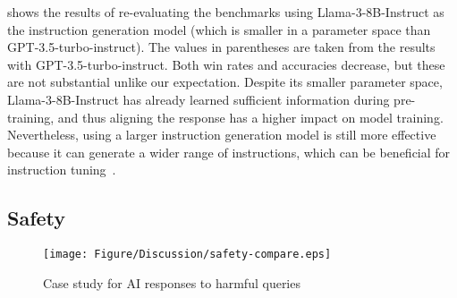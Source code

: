 
 shows the results of re-evaluating the benchmarks 
using Llama-3-8B-Instruct as the instruction generation model
(which is smaller in a parameter space than GPT-3.5-turbo-instruct).
The values in parentheses are taken from
the results with GPT-3.5-turbo-instruct.
Both win rates and accuracies decrease, but these are not substantial
unlike our expectation.
Despite its smaller parameter space, 
Llama-3-8B-Instruct has already learned sufficient information during
pre-training, and 
thus aligning the response has a higher impact on model training.
Nevertheless, using a larger instruction generation model is still
more effective because it can generate a wider range of instructions, 
which can be beneficial for instruction tuning~\cite{instruction-tuning}.

\begin{comment}
\sj{(치명적이지 않다면 아래 내용은 꼭 필요할 것 같지는 않네요)}
However, there is still a lack of in-depth insight into how the specific
characteristics of the instruction generation model, such as parameter size,
generation setting (temperature, top-p, and so on), and the dataset used for
pre-training or fine-tuning, impact the quality of the instruction dataset.
An in-depth analysis of what the better instruction generation model is could 
provide a deeper understanding of how to optimize instruction generation.
Exploring these factors will be crucial to better 
leveraging synthetic data while mitigating the risks of model collapse.
\end{comment}

\subsection{Safety}

\begin{figure}
    \centering
    \texttt{[image: Figure/Discussion/safety-compare.eps]}
    \caption{Case study for AI responses to harmful queries}
    \label{fig:safety-compare}
\end{figure}

\begin{comment}
\cancel{
In this work, we developed and evaluated \ours{} without incorporating safety 
considerations. The limitation of \ours{} is the integration with the training 
phase and instruction generation phase that makes it hard to incorporate the 
safety consideration. We conduct case studies on models' responses
to harmful or violent queries. 
As shown in \FIG{fig:safety-compare}, the model trained with \ours{} generates 
responses without rejecting unsafe content. In contrast, Llama-3-8B-Instruct 
refuses to generate harmful context, as the model has been trained with 
Reinforcement Learning with Human Feedback (RLHF)~\cite{rlhf} and Supervised 
Fine Tuning (SFT)~\cite{sft1, sft2, sft3} to enhance their ability to handle unsafe queries.
}
\end{comment}

